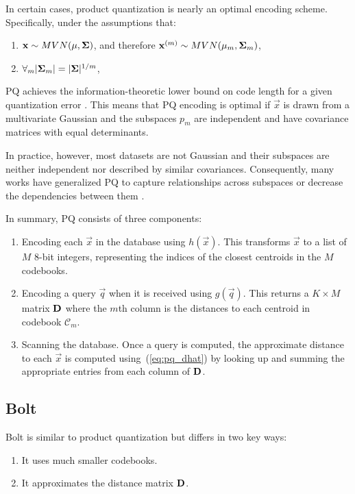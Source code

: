 In certain cases, product quantization is nearly an optimal encoding scheme. Specifically, under the assumptions that:
\begin{enumerate}[leftmargin=7mm]
\item $\mathbf{x} \sim MVN(\mathbf{\mu}, \mathbf{\Sigma})$, and therefore $\mathbf{x}^{(m)} \sim MVN(\mathbf{\mu}_m, \mathbf{\Sigma}_m)$,
\item $\forall_m |\mathbf{\Sigma}_m| = |\mathbf{\Sigma}|^{1/m}$,
\end{enumerate}
PQ achieves the information-theoretic lower bound on code length for a given quantization error \cite{opq}. This means that PQ encoding is optimal if $\vec{x}$ is drawn from a multivariate Gaussian and the subspaces $p_m$ are independent and have covariance matrices with equal determinants.

In practice, however, most datasets are not Gaussian and their subspaces are neither independent nor described by similar covariances. Consequently, many works have generalized PQ to capture relationships across subspaces or decrease the dependencies between them \cite{opq, cartesianKmeans, aq, otq, lsq}.

In summary, PQ consists of three components:
\begin{enumerate}[leftmargin=7mm]
    \item Encoding each $\vec{x}$ in the database using $h(\vec{x})$. This transforms $\vec{x}$ to a list of $M$ 8-bit integers, representing the indices of the closest centroids in the $M$ codebooks.
    \item Encoding a query $\vec{q}$ when it is received using $g(\vec{q})$. This returns a $K \times M$ matrix $\mathbf{D}$ where the $m$th column is the distances to each centroid in codebook $\mathcal{C}_m$.
    \item Scanning the database. Once a query is computed, the approximate distance to each $\vec{x}$ is computed using~(\ref{eq:pq_dhat}) by looking up and summing the appropriate entries from each column of $\mathbf{D}$.
\end{enumerate}

\subsection{Bolt}

Bolt is similar to product quantization but differs in two key ways:
\begin{enumerate}[leftmargin=7mm]
\item It uses much smaller codebooks.
\item It approximates the distance matrix $\mathbf{D}$.
\end{enumerate}

